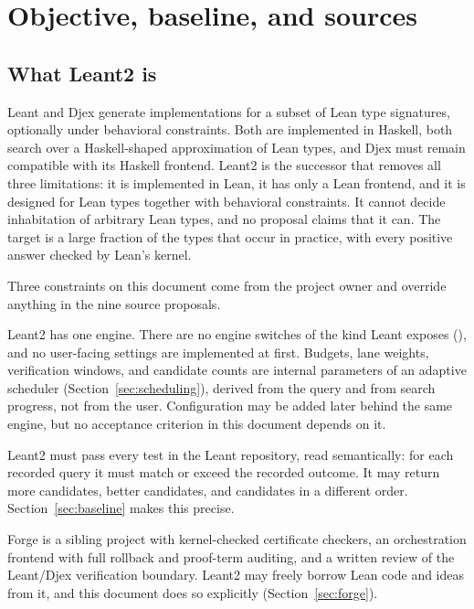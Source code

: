 \section{Objective, baseline, and sources}\label{sec:scope}

\subsection{What Leant2 is}

Leant and Djex generate implementations for a subset of Lean type signatures, optionally under behavioral constraints. Both are implemented in Haskell, both search over a Haskell-shaped approximation of Lean types, and Djex must remain compatible with its Haskell frontend. Leant2 is the successor that removes all three limitations: it is implemented in Lean, it has only a Lean frontend, and it is designed for Lean types together with behavioral constraints. It cannot decide inhabitation of arbitrary Lean types, and no proposal claims that it can. The target is a large fraction of the types that occur in practice, with every positive answer checked by Lean's kernel.

Three constraints on this document come from the project owner and override anything in the nine source proposals.

\begin{decision}\label{dec:single-engine}
Leant2 has one engine. There are no engine switches of the kind Leant exposes (), and no user-facing settings are implemented at first. Budgets, lane weights, verification windows, and candidate counts are internal parameters of an adaptive scheduler (Section~\ref{sec:scheduling}), derived from the query and from search progress, not from the user. Configuration may be added later behind the same engine, but no acceptance criterion in this document depends on it.
\end{decision}

\begin{decision}\label{dec:baseline}
Leant2 must pass every  test in the Leant repository, read semantically: for each recorded query it must match or exceed the recorded outcome. It may return more candidates, better candidates, and candidates in a different order. Section~\ref{sec:baseline} makes this precise.
\end{decision}

\begin{decision}\label{dec:forge}
Forge is a sibling project with kernel-checked certificate checkers, an orchestration frontend with full rollback and proof-term auditing, and a written review of the Leant/Djex verification boundary. Leant2 may freely borrow Lean code and ideas from it, and this document does so explicitly (Section~\ref{sec:forge}).
\end{decision}

